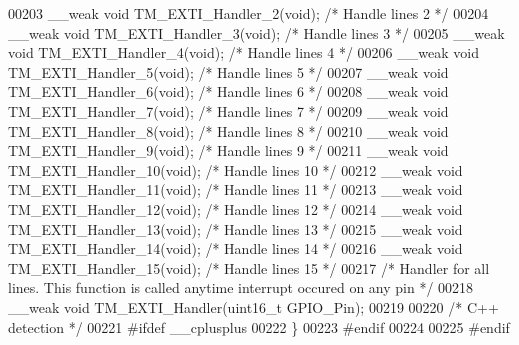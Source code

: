 \begin{DoxyCode}
00203 \_\_weak \textcolor{keywordtype}{void} TM\_EXTI\_Handler\_2(\textcolor{keywordtype}{void});    \textcolor{comment}{/* Handle lines 2 */}
00204 \_\_weak \textcolor{keywordtype}{void} TM\_EXTI\_Handler\_3(\textcolor{keywordtype}{void});    \textcolor{comment}{/* Handle lines 3 */}
00205 \_\_weak \textcolor{keywordtype}{void} TM\_EXTI\_Handler\_4(\textcolor{keywordtype}{void});    \textcolor{comment}{/* Handle lines 4 */}
00206 \_\_weak \textcolor{keywordtype}{void} TM\_EXTI\_Handler\_5(\textcolor{keywordtype}{void});    \textcolor{comment}{/* Handle lines 5 */}
00207 \_\_weak \textcolor{keywordtype}{void} TM\_EXTI\_Handler\_6(\textcolor{keywordtype}{void});    \textcolor{comment}{/* Handle lines 6 */}
00208 \_\_weak \textcolor{keywordtype}{void} TM\_EXTI\_Handler\_7(\textcolor{keywordtype}{void});    \textcolor{comment}{/* Handle lines 7 */}
00209 \_\_weak \textcolor{keywordtype}{void} TM\_EXTI\_Handler\_8(\textcolor{keywordtype}{void});    \textcolor{comment}{/* Handle lines 8 */}
00210 \_\_weak \textcolor{keywordtype}{void} TM\_EXTI\_Handler\_9(\textcolor{keywordtype}{void});    \textcolor{comment}{/* Handle lines 9 */}
00211 \_\_weak \textcolor{keywordtype}{void} TM\_EXTI\_Handler\_10(\textcolor{keywordtype}{void});   \textcolor{comment}{/* Handle lines 10 */}
00212 \_\_weak \textcolor{keywordtype}{void} TM\_EXTI\_Handler\_11(\textcolor{keywordtype}{void});   \textcolor{comment}{/* Handle lines 11 */}
00213 \_\_weak \textcolor{keywordtype}{void} TM\_EXTI\_Handler\_12(\textcolor{keywordtype}{void});   \textcolor{comment}{/* Handle lines 12 */}
00214 \_\_weak \textcolor{keywordtype}{void} TM\_EXTI\_Handler\_13(\textcolor{keywordtype}{void});   \textcolor{comment}{/* Handle lines 13 */}
00215 \_\_weak \textcolor{keywordtype}{void} TM\_EXTI\_Handler\_14(\textcolor{keywordtype}{void});   \textcolor{comment}{/* Handle lines 14 */}
00216 \_\_weak \textcolor{keywordtype}{void} TM\_EXTI\_Handler\_15(\textcolor{keywordtype}{void});   \textcolor{comment}{/* Handle lines 15 */}
00217 \textcolor{comment}{/* Handler for all lines. This function is called anytime interrupt occured on any pin */}
00218 \_\_weak \textcolor{keywordtype}{void} TM\_EXTI\_Handler(uint16\_t GPIO\_Pin);
00219 
00220 \textcolor{comment}{/* C++ detection */}
00221 \textcolor{preprocessor}{#ifdef \_\_cplusplus}
00222 \}
00223 \textcolor{preprocessor}{#endif}
00224 
00225 \textcolor{preprocessor}{#endif}
\end{DoxyCode}
